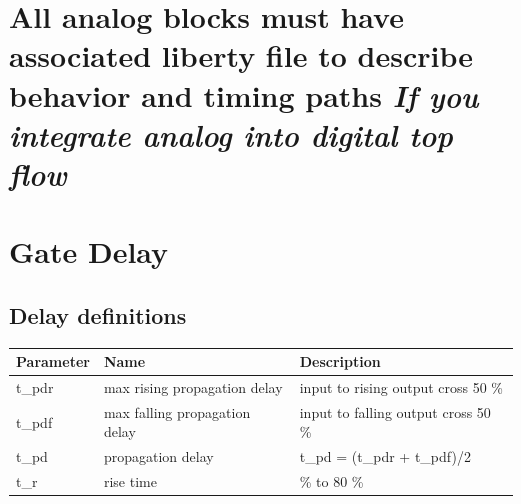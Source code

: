 \section{\texorpdfstring{All analog blocks must have associated liberty
file to describe behavior and timing paths \emph{If you integrate analog
into digital top
flow}}{All analog blocks must have associated liberty file to describe behavior and timing paths If you integrate analog into digital top flow}}\label{all-analog-blocks-must-have-associated-liberty-file-to-describe-behavior-and-timing-paths-if-you-integrate-analog-into-digital-top-flow}

\section{Gate Delay}\label{gate-delay}

\subsection{Delay definitions}\label{delay-definitions}

\begin{longtable}[]{@{}
  >{\raggedright\arraybackslash}p{}
  >{\raggedright\arraybackslash}p{}
  >{\raggedright\arraybackslash}p{}@{}}
\toprule\noalign{}
\begin{minipage}[b]{\linewidth}\raggedright
Parameter
\end{minipage} & \begin{minipage}[b]{\linewidth}\raggedright
Name
\end{minipage} & \begin{minipage}[b]{\linewidth}\raggedright
Description
\end{minipage} \\
\midrule\noalign{}
\endhead
\bottomrule\noalign{}
\endlastfoot
t\_pdr & max rising propagation delay & input to rising output cross 50
\% \\
t\_pdf & max falling propagation delay & input to falling output cross
50 \% \\
t\_pd & propagation delay & t\_pd = (t\_pdr + t\_pdf)/2 \\
t\_r & rise time & 20 \% to 80 \% \\
\end{longtable}

